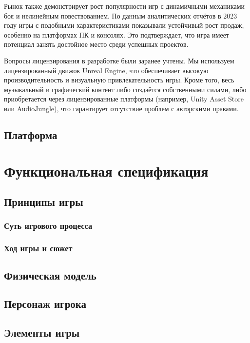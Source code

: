 \documentclass{article}
\begin{document}
Рынок также демонстрирует рост популярности игр с динамичными механиками боя и нелинейным повествованием. По данным аналитических отчётов 
в 2023 году игры с подобными характеристиками показывали устойчивый рост продаж, особенно на платформах ПК и консолях. Это подтверждает, 
что игра имеет потенциал занять достойное место среди успешных проектов.

Вопросы лицензирования в разработке были заранее учтены. Мы используем лицензированный движок Unreal Engine, что обеспечивает 
высокую производительность и визуальную привлекательность игры. Кроме того, весь музыкальный и графический контент либо создаётся 
собственными силами, либо приобретается через лицензированные платформы (например, Unity Asset Store или AudioJungle), что гарантирует 
отсутствие проблем с авторскими правами.
\subsection{Платформа}

\section{Функциональная спецификация}

\subsection{Принципы игры}

\subsubsection{Суть игрового процесса}

\subsubsection{Ход игры и сюжет}

\subsection{Физическая модель}

\subsection{Персонаж игрока}

\subsection{Элементы игры}
\end{document}
